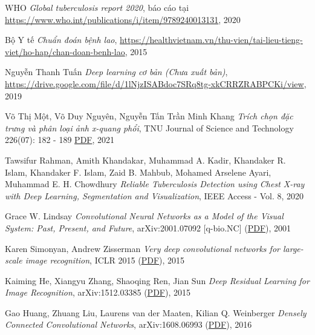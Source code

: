 \begin{thebibliography}{99}
	 WHO {\it Global tuberculosis report 2020}, báo cáo tại \href{https://www.who.int/publications/i/item/9789240013131}{ https://www.who.int/publications/i/item/9789240013131}, 2020
	
	 Bộ Y tế {\it Chuẩn đoán bệnh lao}, \href{https://healthvietnam.vn/thu-vien/tai-lieu-tieng-viet/ho-hap/chan-doan-benh-lao}{https://healthvietnam.vn/thu-vien/tai-lieu-tieng-viet/ho-hap/chan-doan-benh-lao}, 2015
	
	
	 Nguyễn Thanh Tuấn {\it Deep learning cơ bản (Chưa xuất bản)}, \href{https://drive.google.com/file/d/1lNjzISABdoc7SRq8tg-xkCRRZRABPCKi/view}{https://drive.google.com/file/d/1lNjzISABdoc7SRq8tg-xkCRRZRABPCKi/view}, 2019
	
	 Võ Thị Một, Võ Duy Nguyên, Nguyễn Tấn Trần Minh Khang {\it Trích chọn đặc trưng và phân loại ảnh x-quang phổi}, TNU Journal of Science and Technology 226(07): 182 - 189 {\href{http://jst.tnu.edu.vn/jst/article/viewFile/3974/pdf}{PDF}}, 2021
	
	 Tawsifur Rahman, Amith Khandakar, Muhammad A. Kadir, Khandaker R. Islam, Khandaker F. Islam, Zaid B. Mahbub, Mohamed Arselene Ayari, Muhammad E. H. Chowdhury {\it Reliable Tuberculosis Detection using Chest X-ray with Deep Learning, Segmentation and Visualization}, IEEE Access - Vol. 8, 2020
	
	 Grace W. Lindsay {\it Convolutional Neural Networks as a Model of the Visual System: Past, Present, and Future}, 	arXiv:2001.07092 [q-bio.NC] (\href{https://arxiv.org/ftp/arxiv/papers/2001/2001.07092.pdf}{PDF}), 2001
	
	 Karen Simonyan, Andrew Zisserman {\it Very deep convolutional networks for large-scale image recognition}, ICLR 2015 (\href{https://arxiv.org/pdf/1409.1556.pdf}{PDF}), 2015
	
	 Kaiming He, Xiangyu Zhang, Shaoqing Ren, Jian Sun {\it Deep Residual Learning for Image Recognition}, arXiv:1512.03385 (\href{https://arxiv.org/pdf/1512.03385.pdf}{PDF}), 2015	
	
	 Gao Huang, Zhuang Liu, Laurens van der Maaten, Kilian Q. Weinberger {\it Densely Connected Convolutional Networks}, arXiv:1608.06993 (\href{https://arxiv.org/pdf/1608.06993.pdf}{PDF}), 2016 
	  
\end{thebibliography}
